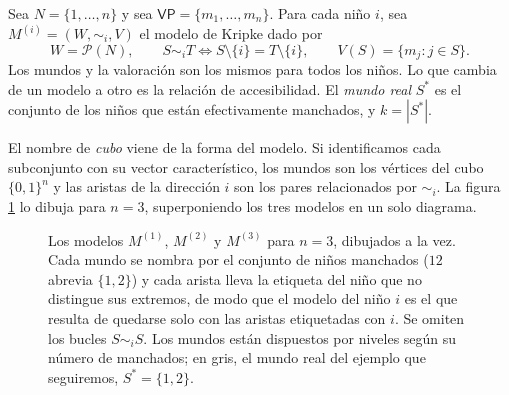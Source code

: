 \begin{definicion}[El cubo]\label{def:cubo}
Sea $N = \{1,\dots,n\}$ y sea $\mathsf{VP} = \{m_1,\dots,m_n\}$. Para cada niño $i$, sea $M^{(i)} = (W, \sim_i, V)$ el modelo de Kripke dado por
\[
  W = \mathcal{P}(N), \qquad
  S \sim_i T \iff S \setminus \{i\} = T \setminus \{i\}, \qquad
  V(S) = \{ m_j : j \in S \}.
\]
Los mundos y la valoración son los mismos para todos los niños. Lo que cambia de un modelo a otro es la relación de accesibilidad. El \emph{mundo real} $S^{*}$ es el conjunto de los niños que están efectivamente manchados, y $k = |S^{*}|$.
\end{definicion}

El nombre de \emph{cubo} viene de la forma del modelo. Si identificamos cada subconjunto con su vector característico, los mundos son los vértices del cubo $\{0,1\}^n$ y las aristas de la dirección $i$ son los pares relacionados por $\sim_i$. La figura \ref{fig:cubo} lo dibuja para $n=3$, superponiendo los tres modelos en un solo diagrama.

\begin{figure}[htb]
\centering
{}
\caption{Los modelos $M^{(1)}$, $M^{(2)}$ y $M^{(3)}$ para $n=3$, dibujados a la vez. Cada mundo se nombra por el conjunto de niños manchados ($12$ abrevia $\{1,2\}$) y cada arista lleva la etiqueta del niño que no distingue sus extremos, de modo que el modelo del niño $i$ es el que resulta de quedarse solo con las aristas etiquetadas con $i$. Se omiten los bucles $S \sim_i S$. Los mundos están dispuestos por niveles según su número de manchados; en gris, el mundo real del ejemplo que seguiremos, $S^{*} = \{1,2\}$.}
\label{fig:cubo}
\end{figure}

